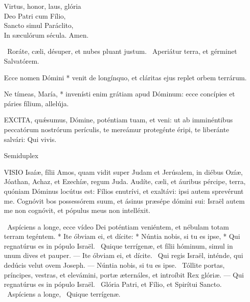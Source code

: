 Virtus, honor, laus, glória\\
Deo Patri cum Fílio,\\
Sancto simul Paráclito,\\
In sæculórum sécula. Amen.

\V\ Roráte, cæli, désuper, et nubes pluant justum. \R\ Aperiátur terra, et gérminet Salvatórem.

 Ecce nomen Dómini * venit de longínquo, et cláritas ejus replet orbem terrárum.


 Ne tímeas, María, * invenísti enim grátiam apud Dóminum: ecce concípies et páries fílium, allelúja.


\lettrine[lines=2]{E}{XCITA}, quǽsumus, Dómine, poténtiam tuam, et veni: ut ab imminéntibus peccatórum nostrórum perículis, te mereámur protegénte éripi, te liberánte salvári: Qui vivis.


\sectionornament


 Semiduplex






\lettrine[lines=2]{V}{ISIO} Isaíæ, fílii Amos, quam vidit super Judam et Jerúsalem, in diébus Ozíæ, Jóathan, Achaz, et Ezechíæ, regum Juda. Audíte, cæli, et áuribus pércipe, terra, quóniam Dóminus locútus est: Fílios enutrívi, et exaltávi: ipsi autem sprevérunt me. Cognóvit bos possessórem suum, et ásinus præsépe dómini sui: Israël autem me non cognóvit, et pópulus meus non intelléxit.

\R\ Aspíciens a longe, ecce vídeo Dei poténtiam veniéntem, et nébulam totam terram tegéntem. * Ite óbviam ei, et dícite: * Núntia nobis, si tu es ipse, * Qui regnatúrus es in pópulo Israël. \V\ Quique terrígenæ, et fílii hóminum, simul in unum dives et pauper. --- Ite óbviam ei, et dícite. \V\ Qui regis Israël, inténde, qui dedúcis velut ovem Joseph. --- Núntia nobis, si tu es ipse. \V\ Tóllite portas, príncipes, vestras, et elevámini, portæ æternáles, et introíbit Rex glóriæ. --- Qui regnatúrus es in pópulo Israël. \V\ Glória Patri, et Fílio, et Spirítui Sancto.  \R\ Aspíciens a longe,  \V\ Quique terrígenæ.

